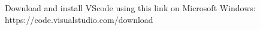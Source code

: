 \setlength{\columnsep}{5pt}
\begin{flushleft}

	Download and install VScode using this link on Microsoft Windows: https://code.visualstudio.com/download

\end{flushleft}

